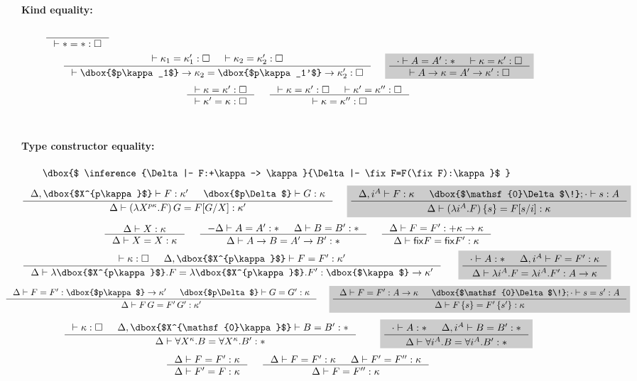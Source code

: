 \begin{figure}\begin{singlespace}\small
\paragraph{Kind equality:} 
$ \quad
 ~~~~
   \inference{}{|- * = *:\square} $
\[
   \inference{ |- \kappa_1 = \kappa_1' : \square
             & |- \kappa_2 = \kappa_2' : \square }{
   |- \dbox{$p\kappa_1$}-> \kappa_2 = \dbox{$p\kappa_1'$}-> \kappa_2' : \square}
 ~~~~ \newFi{
   \inference{\cdot |- A=A':* & |- \kappa=\kappa':\square}{
              |- A -> \kappa = A' -> \kappa' : \square} }
\]
\[ \inference{|- \kappa=\kappa':\square}{
              |- \kappa'=\kappa:\square}
 ~~~~
   \inference{ |- \kappa =\kappa' :\square
             & |- \kappa'=\kappa'':\square}{
              |- \kappa=\kappa'':\square}
\]
~
\paragraph{Type constructor equality:} 
$\qquad \dbox{$
   \inference{\Delta|- F:+\kappa-> \kappa}{\Delta|- \fix F=F(\fix F):\kappa}$ } $
\[
   \inference{ \Delta,\dbox{$X^{p\kappa}$} |- F:\kappa'
   	     & \dbox{$p\Delta$} |- G:\kappa}{
	      \Delta |- (\lambda X^{p\kappa}.F)\,G = F[G/X]:\kappa'}
 ~~~~ \newFi{
   \inference{ \Delta,i^A |- F:\kappa
             & \dbox{$\mathsf{0}\Delta$\!};\cdot |- s:A}{
              \Delta |- (\lambda i^A.F)\,\{s\} = F[s/i]:\kappa} }
\]
\[ \inference{\Delta |- X:\kappa }{\Delta |- X=X:\kappa}
 ~~~~
   \inference{-\Delta |- A=A':* & \Delta |- B=B':*}{\Delta |- A-> B=A'-> B':*}
 ~~~~
   \inference{\Delta |- F=F' : +\kappa -> \kappa}{
	      \Delta |- \fix F = \fix F' : \kappa}
\]
\[
   \inference{ |- \kappa:\square
   	     & \Delta,\dbox{$X^{p\kappa}$} |- F=F' : \kappa'}{
   	\Delta |- \lambda \dbox{$X^{p\kappa}$}.F
		= \lambda \dbox{$X^{p\kappa}$}.F': \dbox{$\kappa$} -> \kappa'}
 ~~~~ ~
 \newFi{
   \inference{\cdot |- A:* & \Delta,i^A |- F=F' : \kappa}{
	      \Delta |- \lambda i^A.F=\lambda i^A.F' : A -> \kappa} }
\]
\[\!\!\!\!\!\!\!\!\!\!\!\!
   \inference{ \Delta |- F=F' : \dbox{$p\kappa$} -> \kappa'
   	     & \dbox{$p\Delta$} |- G=G':\kappa}{
              \Delta |- F\,G = F'\,G' : \kappa'}
 ~~~~
 \newFi{
   \inference{ \Delta |- F=F': A -> \kappa
             & \dbox{$\mathsf{0}\Delta$\!};\cdot |- s=s':A}{
	      \Delta |- F\,\{s\} = F'\,\{s'\} : \kappa} }
\]
\[
   \inference{ |- \kappa:\square
   	     & \Delta,\dbox{$X^{\mathsf{0}\kappa}$} |- B=B':*}{
              \Delta |- \forall X^\kappa.B=\forall X^\kappa.B':*}
 ~~~~ \quad
 \newFi{
   \inference{\cdot |- A:* & \Delta,i^A |- B=B':*}{
              \Delta |- \forall i^A.B=\forall i^A.B':*} }
\]
\[ \inference{\Delta |- F = F' : \kappa}{\Delta |- F' = F : \kappa}
 ~~~~
   \inference{\Delta |- F = F' : \kappa & \Delta |- F' = F'' : \kappa}{
              \Delta |- F = F'' : \kappa}
\]
~

\end{singlespace}
\end{figure}
